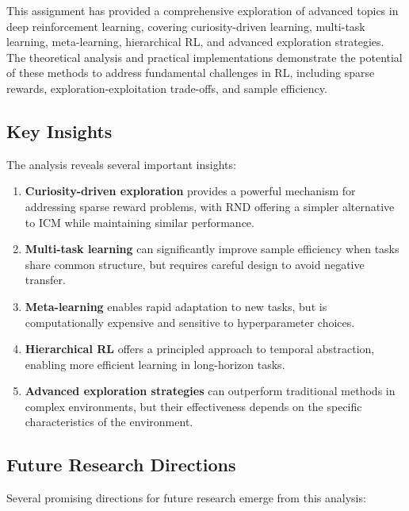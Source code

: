 \documentclass[12pt]{article}
\begin{document}
{{{This assignment has provided a comprehensive exploration of advanced topics in deep reinforcement learning, covering curiosity-driven learning, multi-task learning, meta-learning, hierarchical RL, and advanced exploration strategies. The theoretical analysis and practical implementations demonstrate the potential of these methods to address fundamental challenges in RL, including sparse rewards, exploration-exploitation trade-offs, and sample efficiency.

\subsection{Key Insights}

The analysis reveals several important insights:

\begin{enumerate}
\item \textbf{Curiosity-driven exploration} provides a powerful mechanism for addressing sparse reward problems, with RND offering a simpler alternative to ICM while maintaining similar performance.

\item \textbf{Multi-task learning} can significantly improve sample efficiency when tasks share common structure, but requires careful design to avoid negative transfer.

\item \textbf{Meta-learning} enables rapid adaptation to new tasks, but is computationally expensive and sensitive to hyperparameter choices.

\item \textbf{Hierarchical RL} offers a principled approach to temporal abstraction, enabling more efficient learning in long-horizon tasks.

\item \textbf{Advanced exploration strategies} can outperform traditional methods in complex environments, but their effectiveness depends on the specific characteristics of the environment.
\end{enumerate}

\subsection{Future Research Directions}

Several promising directions for future research emerge from this analysis:

}}}
\end{document}
